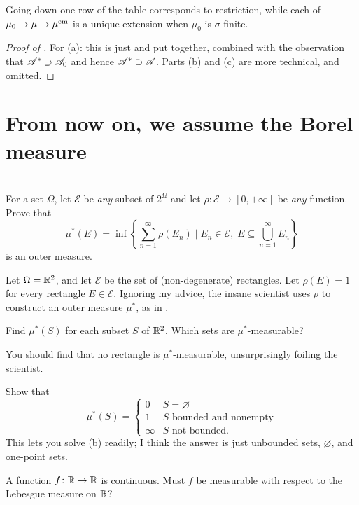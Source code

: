 Going down one row of the table corresponds to restriction,
while each of $\mu_0 \to \mu \to \mu^\text{cm}$ is a unique extension
when $\mu_0$ is $\sigma$-finite.
\begin{proof}
	[Proof of ]
	For (a): this is just  and 
	put together, combined with the observation that $\mathscr A^\ast \supset \mathscr A_0$
	and hence $\mathscr A^\ast \supset \mathscr A$.
	Parts (b) and (c) are more technical, and omitted.
\end{proof}

\section{From now on, we assume the Borel measure}

\section{\problemhead}
\begin{dproblem}
	\label{pr:construct_outer_measure}
	For a set $\Omega$,
	let $\mathcal{E}$ be \emph{any} subset of $2^{\Omega}$
	and let $\rho \colon \mathcal{E} \to [0,+\infty]$
	be \emph{any} function.
	Prove that
	\[ \mu^\ast(E) = \inf \left\{ \sum_{n=1}^\infty \rho(E_n) \mid
		E_n \in \mathcal{E}, \;
		E \subseteq \bigcup_{n=1}^\infty E_n \right\} \]
	is an outer measure.
\end{dproblem}

\begin{problem}
	Let $\Omega = \mathbb R^2$, and let $\mathcal{E}$
	be the set of (non-degenerate) rectangles.
	Let $\rho(E) = 1$ for every rectangle $E \in \mathcal{E}$.
	Ignoring my advice, the insane scientist
	uses $\rho$ to construct an outer measure $\mu^\ast$,
	as in .
	\begin{enumerate}[(a)]
		\ii Find $\mu^\ast(S)$ for each subset $S$ of $\mathbb R^2$.
		\ii Which sets are $\mu^\ast$-measurable?
	\end{enumerate}
	You should find that no rectangle is $\mu^\ast$-measurable,
	unsurprisingly foiling the scientist.
	\begin{hint}
		Show that
		\[ \mu^\ast(S) = \begin{cases}
				0 & S = \varnothing \\
				1 & S \text{ bounded and nonempty} \\
				\infty & S \text{ not bounded}.
			\end{cases}
		\]
		This lets you solve (b) readily;
		I think the answer is just unbounded sets,
		$\varnothing$, and one-point sets.
	\end{hint}
\end{problem}

\begin{problem}
	\gim
	A function $f \colon \mathbb R \to \mathbb R$ is continuous.
	Must $f$ be measurable with respect to the Lebesgue measure on $\mathbb R$?
\end{problem}
